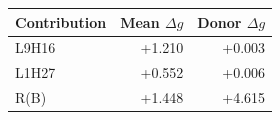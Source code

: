 \begin{tabular}{@{}lrr@{}}
\toprule
Contribution & Mean $\Delta g$ & Donor $\Delta g$ \\
\midrule
L9H16 & +1.210 & +0.003 \\
L1H27 & +0.552 & +0.006 \\
R(B) & +1.448 & +4.615 \\
\bottomrule
\end{tabular}
